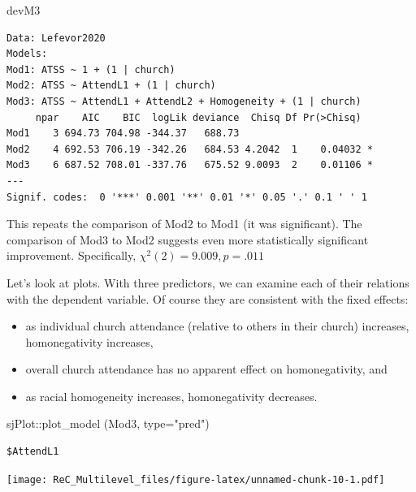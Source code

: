 \documentclass[
  11pt,
]{book}
\newenvironment{Shaded}{\begin{snugshade}}{\end{snugshade}}
\newcommand{\AttributeTok}[1]{\textcolor[rgb]{0.77,0.63,0.00}{#1}}
\newcommand{\FunctionTok}[1]{\textcolor[rgb]{0.00,0.00,0.00}{#1}}
\newcommand{\NormalTok}[1]{#1}
\newcommand{\SpecialCharTok}[1]{\textcolor[rgb]{0.00,0.00,0.00}{#1}}
\newcommand{\StringTok}[1]{\textcolor[rgb]{0.31,0.60,0.02}{#1}}
\providecommand{\tightlist}{%
  \setlength{\itemsep}{0pt}\setlength{\parskip}{0pt}}
\begin{document}
\begin{Shaded}
\begin{Highlighting}[]
\NormalTok{devM3}
\end{Highlighting}
\end{Shaded}

\begin{verbatim}
Data: Lefevor2020
Models:
Mod1: ATSS ~ 1 + (1 | church)
Mod2: ATSS ~ AttendL1 + (1 | church)
Mod3: ATSS ~ AttendL1 + AttendL2 + Homogeneity + (1 | church)
     npar    AIC    BIC  logLik deviance  Chisq Df Pr(>Chisq)  
Mod1    3 694.73 704.98 -344.37   688.73                       
Mod2    4 692.53 706.19 -342.26   684.53 4.2042  1    0.04032 *
Mod3    6 687.52 708.01 -337.76   675.52 9.0093  2    0.01106 *
---
Signif. codes:  0 '***' 0.001 '**' 0.01 '*' 0.05 '.' 0.1 ' ' 1
\end{verbatim}

This repeats the comparison of Mod2 to Mod1 (it was significant). The comparison of Mod3 to Mod2 suggests even more statistically significant improvement. Specifically, \(\chi ^{2}(2) = 9.009, p = .011\)

Let's look at plots. With three predictors, we can examine each of their relations with the dependent variable. Of course they are consistent with the fixed effects:

\begin{itemize}
\tightlist
\item
  as individual church attendance (relative to others in their church) increases, homonegativity increases,
\item
  overall church attendance has no apparent effect on homonegativity, and
\item
  as racial homogeneity increases, homonegativity decreases.
\end{itemize}

\begin{Shaded}
\begin{Highlighting}[]
\NormalTok{sjPlot}\SpecialCharTok{::}\FunctionTok{plot\_model}\NormalTok{ (Mod3, }\AttributeTok{type=}\StringTok{"pred"}\NormalTok{)}
\end{Highlighting}
\end{Shaded}

\begin{verbatim}
$AttendL1
\end{verbatim}

\texttt{[image: ReC\_Multilevel\_files/figure-latex/unnamed-chunk-10-1.pdf]}
\end{document}

